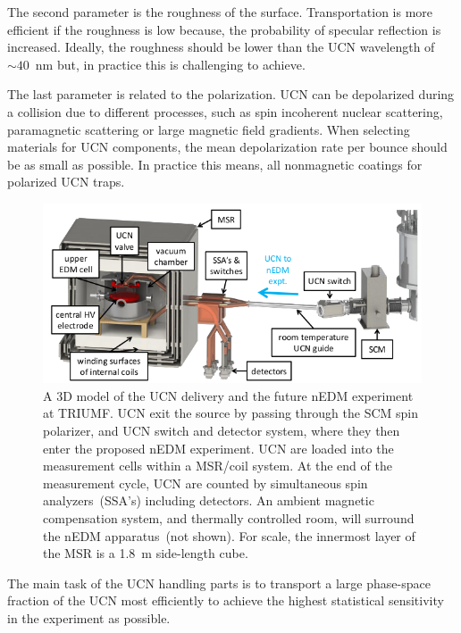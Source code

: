 The second parameter is the roughness of the surface. Transportation
is more efficient if the roughness is low because, the probability of
specular reflection is increased. Ideally, the roughness should be
lower than the UCN wavelength of~$\sim 40$~nm but, in practice this is
challenging to achieve.

The last parameter is related to the polarization. UCN can be
depolarized during a collision due to different processes, such as
spin incoherent nuclear scattering, paramagnetic scattering or large
magnetic field gradients.  When selecting materials for UCN
components, the mean depolarization rate per bounce should be as small
as possible. In practice this means, all nonmagnetic coatings for
polarized UCN traps.
\begin{figure}[h!]
  \centering
  \includegraphics[width=1.0\textwidth]{UCNdelivery.png}
  \caption[3D model of TUCAN's future UCN delivery for the nEDM
  measurement]{A 3D model of the UCN delivery and the future nEDM
    experiment at TRIUMF. UCN exit the source by passing through the
    SCM spin polarizer, and UCN switch and detector system, where they
    then enter the proposed nEDM experiment. UCN are loaded into the
    measurement cells within a MSR/coil system. At the end of the
    measurement cycle, UCN are counted by simultaneous spin
    analyzers~(SSA’s) including detectors. An ambient magnetic
    compensation system, and thermally controlled room, will surround
    the nEDM apparatus~(not shown). For scale, the innermost layer of
    the MSR is a 1.8~m side-length cube.}
  \label{fig:UCNdelivery}
\end{figure}



The main task of the UCN handling parts is to transport a large
phase-space fraction of the UCN most efficiently to achieve the
highest statistical sensitivity in the experiment as possible.

